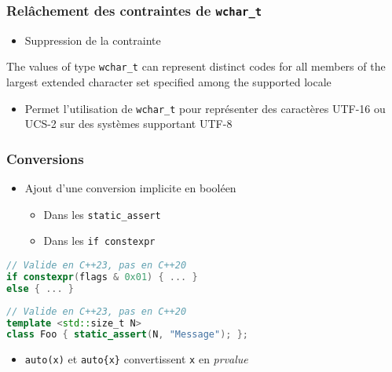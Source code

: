 \documentclass[C++.tex]{subfiles}
\begin{document}
\begin{frame}[fragile]
	\frametitle{Relâchement des contraintes de \lstinline|wchar_t|}
	\begin{itemize}
		\item Suppression de la contrainte
	\end{itemize}

	\begin{block}{}
		The values of type \lstinline|wchar_t| can represent distinct codes for all members of the largest extended character set specified among the supported locale
	\end{block}

	\begin{itemize}		
		\item Permet l'utilisation de \lstinline|wchar_t| pour représenter des caractères UTF-16 ou UCS-2 sur des systèmes supportant UTF-8

	\end{itemize}
\end{frame}

\begin{frame}[fragile]
	\frametitle{Conversions}
	\begin{itemize}
		\item Ajout d'une conversion implicite en booléen
		\begin{itemize}
			\item Dans les \lstinline|static_assert|
			\item Dans les \lstinline|if constexpr|
		\end{itemize}
	\end{itemize}

	\begin{lstlisting}[language=C++]
// Valide en C++23, pas en C++20
if constexpr(flags & 0x01) { ... }
else { ... }\end{lstlisting}

	\begin{lstlisting}[language=C++]
// Valide en C++23, pas en C++20
template <std::size_t N>
class Foo {	static_assert(N, "Message"); };\end{lstlisting}


	\begin{itemize}
		\item \lstinline|auto(x)| et \lstinline|auto{x}| convertissent \lstinline|x| en \textit{prvalue}

	\end{itemize}
\end{frame}
\end{document}
